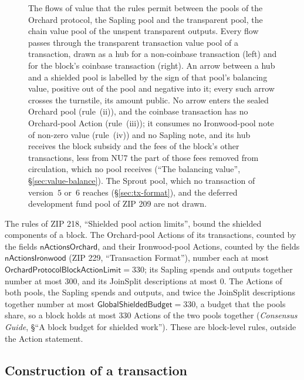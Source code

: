 \documentclass[11pt,a4paper]{article}
\theoremstyle{definition}
\begin{document}
\begin{figure}[tp]
\begin{tikzpicture}
\end{tikzpicture}
\caption{The flows of value that the rules permit between the pools of the
Orchard protocol, the Sapling pool and the transparent pool, the chain
value pool of the unspent transparent outputs. Every flow passes through
the transparent transaction value pool of a transaction, drawn as a hub
for a non-coinbase transaction (left) and for the block's coinbase
transaction (right). An arrow between a hub and a shielded pool is labelled
by the sign of that pool's balancing value, positive out of the pool and
negative into it; every such arrow crosses the turnstile, its amount
public. No arrow enters the sealed Orchard pool (rule~(ii)), and the
coinbase transaction has no Orchard-pool Action (rule~(iii)); it consumes no
Ironwood-pool note of non-zero value (rule~(iv)) and no Sapling note, and
its hub receives the block subsidy and the fees of the block's other
transactions, less from NU7 the part of those fees removed from circulation,
which no pool receives (``The balancing value'', \S\ref{sec:value-balance}).
The Sprout pool, which no transaction of version~$5$ or~$6$ reaches
(\S\ref{sec:tx-format}), and the deferred development fund pool of ZIP 209
are not drawn.}
\label{fig:pool-flows}
\end{figure}

The rules of ZIP 218, ``Shielded pool action limits'', bound the shielded
components of a block. The Orchard-pool Actions of its transactions, counted
by the fields $\mathsf{nActionsOrchard}$, and their Ironwood-pool Actions,
counted by the fields $\mathsf{nActionsIronwood}$ (ZIP 229, ``Transaction
Format''), number each at most
$\mathsf{OrchardProtocolBlockActionLimit} = 330$; its Sapling spends and
outputs together number at most $300$, and its JoinSplit descriptions at
most $0$. The Actions of both pools, the Sapling spends and outputs, and
twice the JoinSplit descriptions together number at most
$\mathsf{GlobalShieldedBudget} = 330$, a budget that the pools share, so a
block holds at most $330$ Actions of the two pools together (\emph{Consensus
Guide}, \S``A block budget for shielded work''). These are block-level
rules, outside the Action statement.

\FloatBarrier
\subsection{Construction of a transaction}\label{sec:tx-construct}
\end{document}
